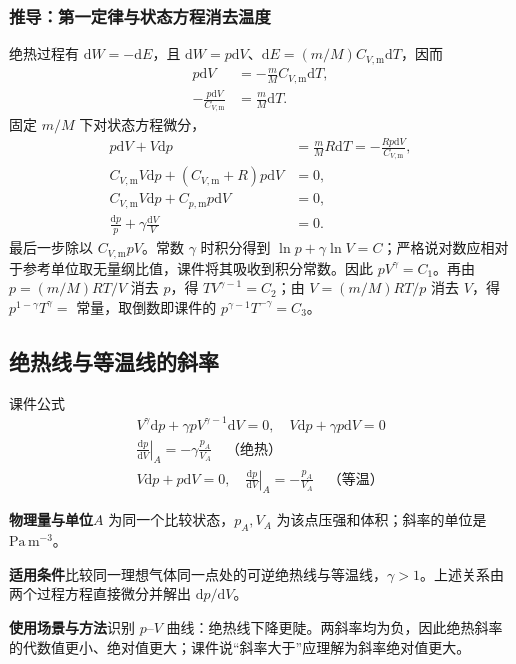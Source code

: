 \documentclass[UTF8,fontset=none,zihao=-4,a4paper]{ctexart}
\newcommand{\explain}[3]{\par\noindent\textbf{物理量与单位}\quad #1\par
\noindent\textbf{适用条件}\quad #2\par
\noindent\textbf{使用场景与方法}\quad #3\par}
\begin{document}
\subsubsection{推导：第一定律与状态方程消去温度}
绝热过程有 $\mathrm dW=-\mathrm dE$，且 $\mathrm dW=p\mathrm dV$、$\mathrm dE=(m/M)C_{V,\mathrm m}\mathrm dT$，因而
\begin{align*}
p\mathrm dV&=-\frac mM C_{V,\mathrm m}\mathrm dT,\\
-\frac{p\mathrm dV}{C_{V,\mathrm m}}&=\frac mM\mathrm dT.
\end{align*}
固定 $m/M$ 下对状态方程微分，
\begin{align*}
p\mathrm dV+V\mathrm dp&=\frac mM R\mathrm dT=-\frac{Rp\mathrm dV}{C_{V,\mathrm m}},\\
C_{V,\mathrm m}V\mathrm dp+(C_{V,\mathrm m}+R)p\mathrm dV&=0,\\
C_{V,\mathrm m}V\mathrm dp+C_{p,\mathrm m}p\mathrm dV&=0,\\
\frac{\mathrm dp}p+\gamma\frac{\mathrm dV}V&=0.
\end{align*}
最后一步除以 $C_{V,\mathrm m}pV$。常数 $\gamma$ 时积分得到 $\ln p+\gamma\ln V=C$；严格说对数应相对于参考单位取无量纲比值，课件将其吸收到积分常数。因此 $pV^\gamma=C_1$。再由 $p=(m/M)RT/V$ 消去 $p$，得 $TV^{\gamma-1}=C_2$；由 $V=(m/M)RT/p$ 消去 $V$，得 $p^{1-\gamma}T^\gamma=$ 常量，取倒数即课件的 $p^{\gamma-1}T^{-\gamma}=C_3$。

\par\noindent\begin{minipage}{\linewidth}
\subsection{绝热线与等温线的斜率}
\begin{infobox}[breakable=false]{课件公式}
\begin{gather*}V^\gamma\mathrm dp+\gamma pV^{\gamma-1}\mathrm dV=0,\quad V\mathrm dp+\gamma p\mathrm dV=0\\\left.\frac{\mathrm dp}{\mathrm dV}\right|_A=-\gamma\frac{p_A}{V_A}\quad\text{（绝热）}\\V\mathrm dp+p\mathrm dV=0,\quad\left.\frac{\mathrm dp}{\mathrm dV}\right|_A=-\frac{p_A}{V_A}\quad\text{（等温）}\end{gather*}
\end{infobox}
\end{minipage}\par
\explain{$A$ 为同一个比较状态，$p_A,V_A$ 为该点压强和体积；斜率的单位是 $\mathrm{Pa\,m^{-3}}$。}{比较同一理想气体同一点处的可逆绝热线与等温线，$\gamma>1$。上述关系由两个过程方程直接微分并解出 $\mathrm dp/\mathrm dV$。}{识别 $p$--$V$ 曲线：绝热线下降更陡。两斜率均为负，因此绝热斜率的代数值更小、绝对值更大；课件说“斜率大于”应理解为斜率绝对值更大。}
\end{document}
